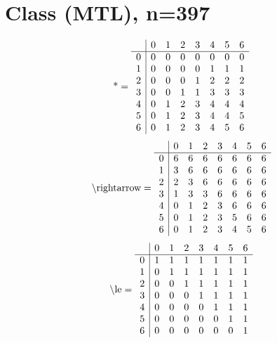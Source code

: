 \documentclass[11pt]{article}
\begin{document}
\section{Class (MTL), n=397}
\[\text{*} = 
\begin{array}{r | r r r r r r r}
 & 0 & 1 & 2 & 3 & 4 & 5 & 6 \\ \hline
0 & 0 & 0 & 0 & 0 & 0 & 0 & 0 \\
1 & 0 & 0 & 0 & 0 & 1 & 1 & 1 \\
2 & 0 & 0 & 0 & 1 & 2 & 2 & 2 \\
3 & 0 & 0 & 1 & 1 & 3 & 3 & 3 \\
4 & 0 & 1 & 2 & 3 & 4 & 4 & 4 \\
5 & 0 & 1 & 2 & 3 & 4 & 4 & 5 \\
6 & 0 & 1 & 2 & 3 & 4 & 5 & 6 \\
\end{array}
\]
\[\text{\textbackslash rightarrow} = 
\begin{array}{r | r r r r r r r}
 & 0 & 1 & 2 & 3 & 4 & 5 & 6 \\ \hline
0 & 6 & 6 & 6 & 6 & 6 & 6 & 6 \\
1 & 3 & 6 & 6 & 6 & 6 & 6 & 6 \\
2 & 2 & 3 & 6 & 6 & 6 & 6 & 6 \\
3 & 1 & 3 & 3 & 6 & 6 & 6 & 6 \\
4 & 0 & 1 & 2 & 3 & 6 & 6 & 6 \\
5 & 0 & 1 & 2 & 3 & 5 & 6 & 6 \\
6 & 0 & 1 & 2 & 3 & 4 & 5 & 6 \\
\end{array}
\]
\[\text{\textbackslash le} = 
\begin{array}{r | r r r r r r r}
 & 0 & 1 & 2 & 3 & 4 & 5 & 6 \\ \hline
0 & 1 & 1 & 1 & 1 & 1 & 1 & 1 \\
1 & 0 & 1 & 1 & 1 & 1 & 1 & 1 \\
2 & 0 & 0 & 1 & 1 & 1 & 1 & 1 \\
3 & 0 & 0 & 0 & 1 & 1 & 1 & 1 \\
4 & 0 & 0 & 0 & 0 & 1 & 1 & 1 \\
5 & 0 & 0 & 0 & 0 & 0 & 1 & 1 \\
6 & 0 & 0 & 0 & 0 & 0 & 0 & 1 \\
\end{array}
\]
\end{document}
